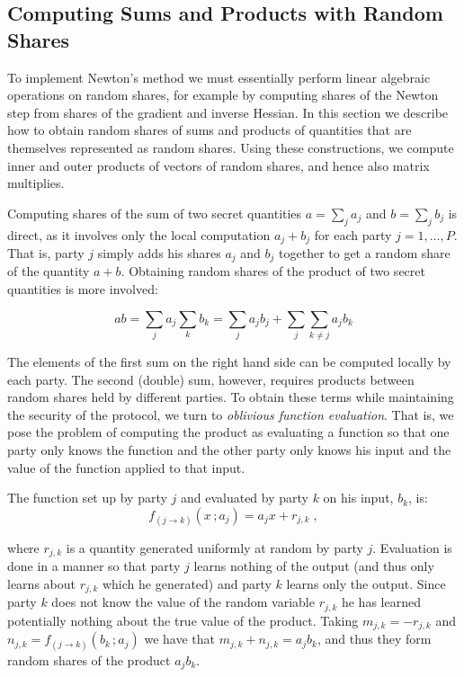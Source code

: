 \documentclass[11pt]{article}
\begin{document}
\subsection{Computing Sums and Products with Random Shares}\label{sec_la}

To implement Newton's method we must essentially  perform linear algebraic operations on random shares, for example by computing shares of the Newton step from shares of the gradient and inverse Hessian.  In this section we describe how to obtain random shares of sums and products of quantities that are themselves represented as random shares.  Using these constructions, we   compute inner and outer products of vectors of random shares, and hence also matrix multiplies.

Computing shares of the sum of two secret quantities $a=\sum_j a_j$ and $b=\sum_j b_j$ is direct, as it involves only the local computation $a_j+b_j$ for each party $j=1,\ldots, P$. That is, party $j$ simply adds his shares $a_j$ and $b_j$ together to get a random share of the quantity $a+b$.
Obtaining random shares of the product of two secret quantities is more involved:

\begin{equation*} ab = \sum_ja_j\sum_kb_k = \sum_j{a_jb_j} + \sum_j\sum_{k\neq j}{a_jb_k} \end{equation*}

\noindent  The elements of the first sum on the right hand side can be computed locally by each party.  The second (double) sum, however,  requires products between random shares held by different parties.  To obtain these terms while maintaining the security of the protocol, we turn to \emph{oblivious function evaluation}.  That is, we pose the problem of computing the product as evaluating a function so that one party only knows the function and the other party only knows his input and the value of the function applied to that input.

The function set up by party $j$ and evaluated by party $k$ on his input, $b_k$, is:
\begin{equation}\label{prod-share-fn}
f_{(j \rightarrow k)}(x\, ; a_j)  = a_jx + r_{j,k} \; ,
\end{equation}

\noindent where $r_{j,k}$ is a quantity generated uniformly at random by party $j$.  Evaluation is done in a manner so that party $j$ learns nothing of the output (and thus only learns about $r_{j,k}$ which he generated) and party $k$ learns only the output.  Since party $k$ does not know the value of the random variable $r_{j,k}$ he has learned potentially nothing about the true value of the product.  Taking $m_{j,k} = -r_{j,k}$ and $n_{j,k} = f_{(j\rightarrow k)}(b_k\,;a_j)$ we have that $m_{j,k} + n_{j,k} = a_jb_k$, and thus they form random shares of the product $a_jb_k$.
\end{document}
